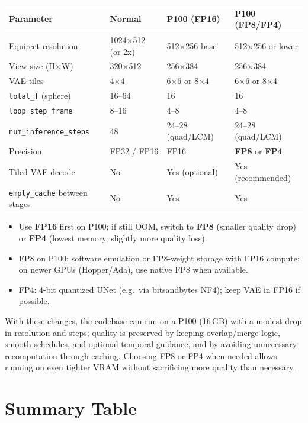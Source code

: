\documentclass[11pt,a4paper]{article}
\newcommand{\fn}[1]{\texttt{#1}}
\begin{document}
\begin{center}
\begin{tabular}{llll}
\toprule
\textbf{Parameter} & \textbf{Normal} & \textbf{P100 (FP16)} & \textbf{P100 (FP8/FP4)} \\
\midrule
Equirect resolution & 1024$\times$512 (or 2x) & 512$\times$256 base & 512$\times$256 or lower \\
View size (H$\times$W) & 320$\times$512 & 256$\times$384 & 256$\times$384 \\
VAE tiles & 4$\times$4 & 6$\times$6 or 8$\times$4 & 6$\times$6 or 8$\times$4 \\
\fn{total\_f} (sphere) & 16--64 & 16 & 16 \\
\fn{loop\_step\_frame} & 8--16 & 4--8 & 4--8 \\
\fn{num\_inference\_steps} & 48 & 24--28 (quad/LCM) & 24--28 (quad/LCM) \\
Precision & FP32 / FP16 & FP16 & \textbf{FP8} or \textbf{FP4} \\
Tiled VAE decode & No & Yes (optional) & Yes (recommended) \\
\fn{empty\_cache} between stages & No & Yes & Yes \\
\bottomrule
\end{tabular}
\end{center}

\begin{itemize}
    \item Use \textbf{FP16} first on P100; if still OOM, switch to \textbf{FP8} (smaller quality drop) or \textbf{FP4} (lowest memory, slightly more quality loss).
    \item FP8 on P100: software emulation or FP8-weight storage with FP16 compute; on newer GPUs (Hopper/Ada), use native FP8 when available.
    \item FP4: 4-bit quantized UNet (e.g.\ via bitsandbytes NF4); keep VAE in FP16 if possible.
\end{itemize}

With these changes, the codebase can run on a P100 (16\,GB) with a modest drop in resolution and steps; quality is preserved by keeping overlap/merge logic, smooth schedules, and optional temporal guidance, and by avoiding unnecessary recomputation through caching. Choosing FP8 or FP4 when needed allows running on even tighter VRAM without sacrificing more quality than necessary.

\section{Summary Table}
\end{document}
